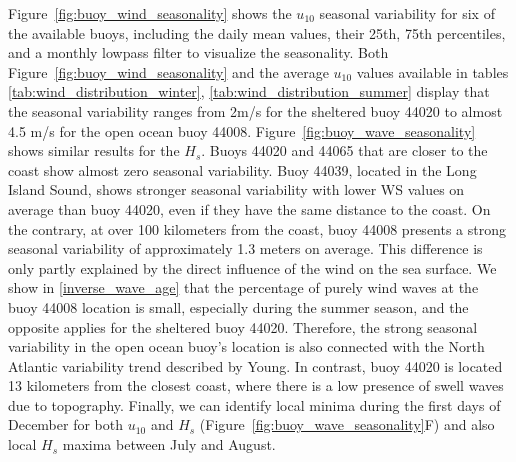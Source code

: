 Figure~\ref{fig:buoy_wind_seasonality} shows the $u_{10}$ seasonal variability for six of the available buoys, including the daily mean values, their 25th, 75th percentiles, and a monthly lowpass filter to visualize the seasonality. Both Figure~\ref{fig:buoy_wind_seasonality} and the average $u_{10}$ values available in tables \ref{tab:wind_distribution_winter},  \ref{tab:wind_distribution_summer} display that the seasonal variability ranges from 2m/s for the sheltered buoy 44020 to almost 4.5 m/s for the open ocean buoy 44008. Figure~\ref{fig:buoy_wave_seasonality} shows similar results for the $H_{s}$. Buoys 44020 and 44065 that are closer to the coast show almost zero seasonal variability. Buoy 44039, located in the Long Island Sound, shows stronger seasonal variability with lower WS values on average than buoy 44020, even if they have the same distance to the coast. On the contrary, at over 100 kilometers from the coast, buoy 44008 presents a strong seasonal variability of approximately 1.3 meters on average. This difference is only partly explained by the direct influence of the wind on the sea surface. We show in \ref{inverse_wave_age} that the percentage of purely wind waves at the buoy 44008 location is small, especially during the summer season, and the opposite applies for the sheltered buoy 44020. Therefore, the strong seasonal variability in the open ocean buoy's location is also connected with the North Atlantic variability trend described by Young. In contrast, buoy 44020 is located 13 kilometers from the closest coast, where there is a low presence of swell waves due to topography. Finally, we can identify local minima during the first days of December for both $u_{10}$ and $H_{s}$ (Figure~\ref{fig:buoy_wave_seasonality}F) and also local $H_{s}$ maxima between July and August.





